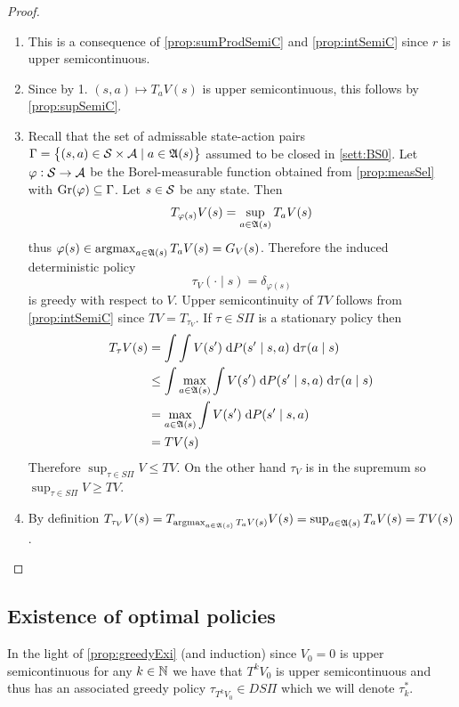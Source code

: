 \begin{proof}
  \leavevmode
  \begin{enumerate}
    \item This is a consequence of \cref{prop:sumProdSemiC}
      and \cref{prop:intSemiC} since $r$ is upper semicontinuous.
    \item Since by 1. $(s, a) \mapsto T_a V(s)$ is upper semicontinuous, this
      follows by \cref{prop:supSemiC}.
    \item Recall that the set of admissable state-action pairs
      $\Gamma = \left\{ (s, a) \in \mathcal{S} \times \mathcal{A} 
      \mid a \in \frak{A}(s) \right\}$ assumed to be closed in
      \cref{sett:BS0}.
      Let $\varphi : \mathcal{S} \to \mathcal{A}$ be the Borel-measurable function
      obtained from \cref{prop:measSel}
      with $\mathrm{Gr}(\varphi) \subseteq \Gamma$.
      Let $s \in \mathcal{S}$ be any state. Then
      \[ T_{\varphi(s)} V(s) = \sup_{a \in \frak{A}(s)} T_a V(s) \]
      thus $\varphi(s) \in \operatorname*{argmax}_{a \in \frak{A}(s)} T_a V(s) = G_V(s)$.
      Therefore the induced deterministic policy
      \[ \tau_V(\cdot \mid s) = \delta_{\varphi(s)} \]
      is greedy with respect to $V$. Upper semicontinuity of $TV$ follows
      from \cref{prop:intSemiC} since $TV = T_{\tau_V}$.
      If $\tau \in S\Pi$ is a stationary policy then
      \begin{align*}
	T_\tau V(s) &=
	\int \int V(s') \; \mathrm{d} P(s' \mid s, a) \; \mathrm{d} \tau(a \mid s)
	\\ & \leq \int \max_{a \in \frak{A}(s)} \int V(s') \; \mathrm{d} P(s' \mid s, a)
	\; \mathrm{d} \tau(a \mid s)
	\\ & = \max_{a \in \frak{A}(s)} \int V(s') \; \mathrm{d} P(s' \mid s, a)
	\\ & = TV(s)
      \end{align*}
      Therefore $\sup_{\tau \in S\Pi} V \leq TV$. On the other hand
      $\tau_V$ is in the supremum so
      $\sup_{\tau \in S\Pi} V \geq TV$.
    \item By definition $T_{\tau_V} V(s) = T_{\operatorname*{argmax}_{a \in \frak{A}(s)} T_a V(s)}
      V(s) = \sup_{a \in \frak{A}(s)} T_a V(s) = TV(s)$.
  \end{enumerate}
\end{proof}

\subsection{Existence of optimal policies}

In the light of \cref{prop:greedyExi} (and induction)
since $V_0 = 0$ is upper semicontinuous for any $k \in \mathbb{N}$ we have that
$T^k V_0$ is upper semicontinuous and thus has an associated greedy
policy $\tau_{T^k V_0} \in DS\Pi$ which we will denote $\tau^*_k$.

